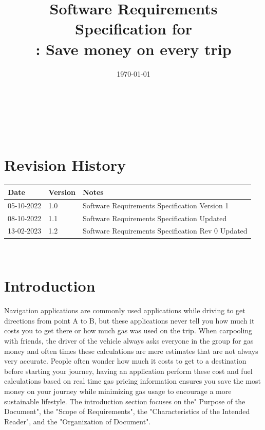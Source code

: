 \documentclass[12pt]{article}
\begin{document}
\title{Software Requirements Specification for \\ \progname: Save money on every trip} 
\author{\authname}
\date{\today}
	
\maketitle

~\newpage


\tableofcontents

~\newpage

\section*{Revision History}

\begin{tabularx}{\textwidth}{p{3cm}p{2cm}X}
\toprule {\bf Date} & {\bf Version} & {\bf Notes}\\
\midrule
05-10-2022 & 1.0 & Software Requirements Specification Version 1\\
08-10-2022 & 1.1 & Software Requirements Specification Updated\\
13-02-2023 & 1.2 & Software Requirements Specification Rev 0 Updated\\
\bottomrule
\end{tabularx}

~\newpage


\section{Introduction}

Navigation applications are commonly used applications while driving to get
directions from point A to B, but these applications never tell you how much it
costs you to get there or how much gas was used on the trip. When carpooling
with friends, the driver of the vehicle always asks everyone in the group for gas
money and often times these calculations are mere estimates that are not always
very accurate. People often wonder how much it costs to get to a destination
before starting your journey, having an application perform these cost and fuel
calculations based on real time gas pricing information ensures you save the
most money on your journey while minimizing gas usage to encourage a more
sustainable lifestyle. The introduction section focuses on the" Purpose of the Document", 
the "Scope of Requirements", the "Characteristics of the Intended Reader", 
and the "Organization of Document". 
\end{document}
